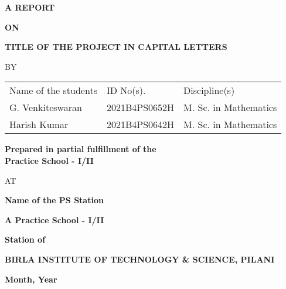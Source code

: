 \documentclass{book}
\begin{document}


\large

\thispagestyle{empty}
\centerline{\bf A REPORT}
\vspace*{0.3cm}
\centerline{\bf ON}
\vspace*{0.3cm}
\centerline{\bf TITLE OF THE PROJECT IN CAPITAL LETTERS} %
\vspace*{2cm}

\centerline{BY}
\vspace*{1cm}

\begin{center}
	\begin{tabular}{lll} %
		Name of the students & \hspace*{2cm} ID No(s). & \hspace*{2cm} Discipline(s) \\ 
		G. Venkiteswaran &\hspace*{2cm} 2021B4PS0652H &\hspace*{2cm} M. Sc. in Mathematics \\
		Harish Kumar &\hspace*{2cm} 2021B4PS0642H &\hspace*{2cm} M. Sc. in Mathematics \\
	\end{tabular}
\end{center}

\vspace*{2cm}
\begin{center}
	{\bf Prepared in partial fulfillment of the \\
	Practice School - I/II} \\ %
\end{center}

\vspace*{0.5cm}

\centerline{AT}

\vspace*{1cm}
        \centerline{\bf Name of the PS Station} %
	\vspace{0.2cm}
	\centerline{\bf A Practice School - I/II}
	\vspace{0.2cm}
	\centerline{\bf Station of}
	\vspace{0.5cm}
\begin{figure}[ht]
\epsfxsize=1.0in
\centerline{}
\end{figure}

	\centerline{\bf BIRLA INSTITUTE OF TECHNOLOGY \& SCIENCE, PILANI}
	\vspace*{0.5cm}
	\centerline{\bf Month, Year} %
	\newpage
\end{document}
